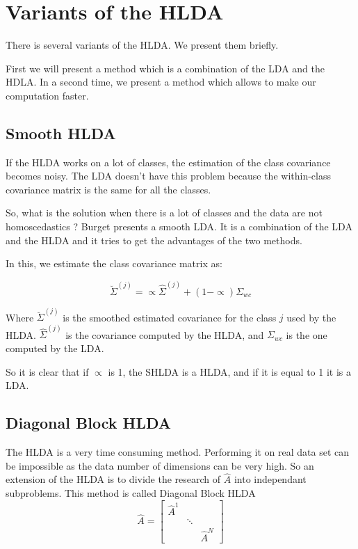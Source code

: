 \section{Variants of the HLDA}
\label{sec:variants}

There is several variants of the HLDA. We present them briefly.

First we will present a method which is a combination of the LDA and
the HDLA. In a second time, we present a method which allows to make our
computation faster.

\subsection{Smooth HLDA}
\label{sec:smooth-hlda}

If the HLDA works on a lot of classes, the estimation of the class
covariance becomes noisy. The LDA doesn't have this problem because
the within-class covariance matrix is the same for all the classes.

So, what is the solution when there is a lot of classes and the data
are not homoscedastics ? Burget\cite{burget.2004} presents a smooth
LDA. It is a combination of the LDA and the HLDA and it tries to get
the advantages of the two methods.

In this, we estimate the class covariance matrix as:

$$\breve\Sigma^{\left( j\right) }=\propto \hat\Sigma^{\left( j\right) } +\left( 1- \propto\right) \Sigma_{wc}$$

Where $\breve\Sigma^{\left( j\right) }$ is the smoothed estimated
covariance for the class $j$ used by the HLDA.
$\hat\Sigma^{\left(j\right) }$ is the covariance computed by the HLDA, and
$\Sigma_{wc}$ is the one computed by the LDA.

So it is clear that if $\propto$ is 1, the SHLDA is a HLDA, and if it
is equal to 1 it is a LDA.

\subsection{Diagonal Block HLDA}
\label{sec:db-hlda}

The HLDA is a very time consuming method. Performing it on real data set can be impossible as the data number of dimensions can be very high.
So an extension of the HLDA is to divide the research of $\hat{A}$ into independant subproblems.
This method is called Diagonal Block HLDA\cite{zhang2011}
$$
\hat{A} = \left [
\begin{array}{ccc}
\hat{A}^{1} \\
& \ddots \\
& & \hat{A}^{N}
\end{array}
\right ]
$$

